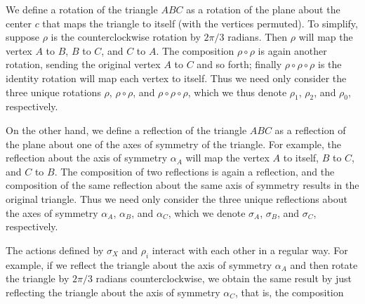 \begin{example}
    We define a rotation of the triangle \(ABC\) as a rotation of the plane
    about the center \(c\) that maps the triangle to itself (with the vertices
    permuted). To simplify, suppose \(\rho\) is the counterclockwise rotation by
    \(2\pi/3\) radians. Then \(\rho\) will map the vertex \(A\) to \(B\), \(B\)
    to \(C\), and \(C\) to \(A\). The composition \(\rho \circ \rho\) is again
    another rotation, sending the original vertex \(A\) to \(C\) and so forth;
    finally \(\rho \circ \rho \circ \rho\) is the identity rotation will map
    each vertex to itself. Thus we need only consider the three unique rotations
    \(\rho\), \(\rho \circ \rho\), and \(\rho \circ \rho \circ \rho\), which we
    thus denote \(\rho_1\), \(\rho_2\), and \(\rho_0\), respectively.

    On the other hand, we define a reflection of the triangle \(ABC\) as a
    reflection of the plane about one of the axes of symmetry of the triangle.
    For example, the reflection about the axis of symmetry \(\alpha_A\) will map
    the vertex \(A\) to itself, \(B\) to \(C\), and \(C\) to \(B\). The
    composition of two reflections is again a reflection, and the composition of
    the same reflection about the same axis of symmetry results in the original
    triangle. Thus we need only consider the three unique reflections about the
    axes of symmetry \(\alpha_A\), \(\alpha_B\), and \(\alpha_C\), which we
    denote \(\sigma_A\), \(\sigma_B\), and \(\sigma_C\), respectively.

    The actions defined by \(\sigma_X\) and \(\rho_i\) interact with each other
    in a regular way. For example, if we reflect the triangle about the axis of
    symmetry \(\alpha_A\) and then rotate the triangle by \(2\pi/3\) radians
    counterclockwise, we obtain the same result by just reflecting the triangle
    about the axis of symmetry \(\alpha_C\), that is, the composition
    \begin{center}
\end{center}
\end{example}
